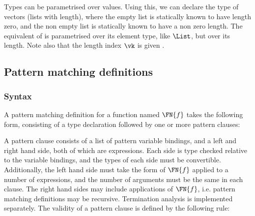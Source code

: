 Types can be
parametrised over values. Using this, we can declare the type of
vectors (lists with length), where the empty list is statically known
to have length zero, and the non empty list is statically known to
have a non zero length. The \TT{} equivalent of  is parametrised over its element type,
like $\List$, but  over its length. Note also that the length
index $\vk$ is given .

\DM{
\AR{
\Data\hg\Vect\:(\va\Hab\Type)\Hab\Nat\to\Type\hg\Where \\
\hg\hg\ARd{
& \nil\Hab\Vect\:\va\:\Z\\
\mid & (\cons)\Hab\fbind{\vk}{\Nat}{
\fbind{\vx}{\va}{\fbind{\vxs}{\Vect\:\va\:\vk}{\Vect\:\va\:(\suc\:\vk)}}
}
}
}
}

\subsection{Pattern matching definitions}

\label{sect:patdefs}

\subsubsection{Syntax}

A pattern matching definition for a function named $\FN{f}$ takes the following form,
consisting of a type declaration followed by one or more pattern clauses:


A pattern clause consists of a list of pattern variable bindings, 
and a left and right hand side, both of which
are \TT{} expressions. Each side is type checked relative to the variable bindings,
and the types of each side must be convertible. Additionally, the
left hand side must take the form of $\FN{f}$ applied to a number of \TT{} expressions,
and the number of arguments must be the same in each clause. The right hand
sides may include applications of $\FN{f}$, i.e. pattern matching definitions may
be recursive. Termination analysis is implemented separately. The validity of a pattern
clause is defined by the following rule:


